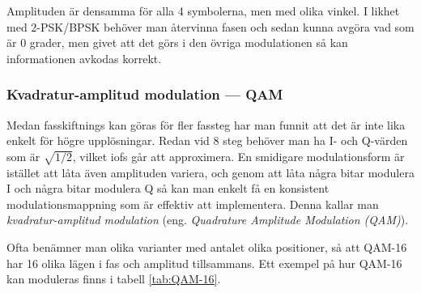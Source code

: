 Amplituden är densamma för alla 4 symbolerna, men med olika vinkel.
I likhet med 2-PSK/BPSK behöver man återvinna fasen och sedan kunna avgöra
vad som är 0 grader, men givet att det görs i den övriga modulationen så
kan informationen avkodas korrekt.

\subsubsection{Kvadratur-amplitud modulation --- QAM}
\label{QAM}


Medan fasskiftnings kan göras för fler fassteg har man funnit att det är
inte lika enkelt för högre upplösningar. Redan vid 8 steg behöver man ha
I- och Q-värden som är \(\sqrt{1/2}\), vilket iofs går att approximera.
En smidigare modulationsform är istället att låta även amplituden variera,
och genom att låta några bitar modulera I och några bitar modulera Q så kan
man enkelt få en konsistent modulationsmappning som är effektiv att
implementera. Denna kallar man \emph{kvadratur-amplitud modulation} (eng.
\emph{Quadrature Amplitude Modulation (QAM)}).

Ofta benämner man olika varianter med antalet olika positioner, så att QAM-16
har 16 olika lägen i fas och amplitud tillsammans.
Ett exempel på hur QAM-16 kan moduleras finns i tabell \ref{tab:QAM-16}.

